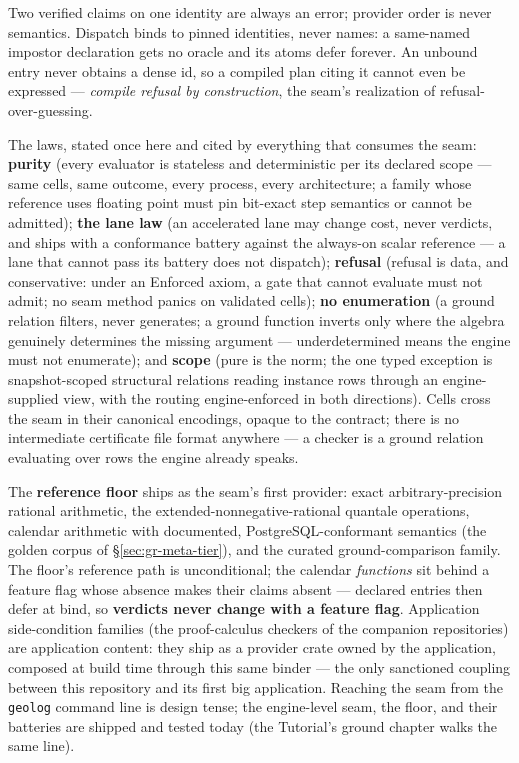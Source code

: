 \noindent Two verified claims on one identity are always an error;
provider order is never semantics. Dispatch binds to pinned
identities, never names: a same-named impostor declaration gets no
oracle and its atoms defer forever. An unbound entry never obtains a
dense id, so a compiled plan citing it cannot even be expressed —
\emph{compile refusal by construction}, the seam's realization of
refusal-over-guessing.

The laws, stated once here and cited by everything that consumes the
seam: \textbf{purity} (every evaluator is stateless and deterministic
per its declared scope — same cells, same outcome, every process,
every architecture; a family whose reference uses floating point must
pin bit-exact step semantics or cannot be admitted);
\textbf{the lane law} (an accelerated lane may change cost, never
verdicts, and ships with a conformance battery against the always-on
scalar reference — a lane that cannot pass its battery does not
dispatch); \textbf{refusal} (refusal is data, and conservative: under
an Enforced axiom, a gate that cannot evaluate must not admit; no
seam method panics on validated cells); \textbf{no enumeration} (a
ground relation filters, never generates; a ground function inverts
only where the algebra genuinely determines the missing argument —
underdetermined means the engine must not enumerate); and
\textbf{scope} (pure is the norm; the one typed exception is
snapshot-scoped structural relations reading instance rows through an
engine-supplied view, with the routing engine-enforced in both
directions). Cells cross the seam in their canonical encodings,
opaque to the contract; there is no intermediate certificate file
format anywhere — a checker is a ground relation evaluating over rows
the engine already speaks.

The \textbf{reference floor} ships as the seam's first provider:
exact arbitrary-precision rational arithmetic, the
extended-nonnegative-rational quantale operations, calendar
arithmetic with documented, PostgreSQL-conformant semantics (the
golden corpus of \S\ref{sec:gr-meta-tier}), and the curated
ground-comparison family. The floor's reference path is
unconditional; the calendar \emph{functions} sit behind a feature
flag whose absence makes their claims absent — declared entries then
defer at bind, so \textbf{verdicts never change with a feature flag}.
Application side-condition families (the proof-calculus checkers of
the companion repositories) are application content: they ship as a
provider crate owned by the application, composed at build time
through this same binder — the only sanctioned coupling between this
repository and its first big application. Reaching the seam from the
\texttt{geolog} command line is design tense; the engine-level seam,
the floor, and their batteries are shipped and tested today (the
Tutorial's ground chapter walks the same line).

